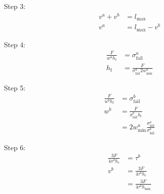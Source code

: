 Step 3:
\begin{align*}
	v^a + v^b &= l_\text{max} \\
	v^a &= l_\text{max} - v^b
\end{align*}

Step 4:
\begin{align*}
	\frac{ F }{ w^a h_\text{f} } &= \sigma^a_\text{fail} \\
	h_\text{f} %
	 &= \frac{F}{ \sigma^a_\text{fail}  2 w^a_\text{min} }
\end{align*}

Step 5:
\begin{align*}
	\frac{ F }{ w^b h_\text{f} } &= \sigma^b_\text{fail} \\
	w^b &= \frac{ F }{ \sigma^b_\text{fail} h_\text{f} } \\
	&=  2 w^a_\text{min} \frac{ \sigma^a_\text{fail} }{ \sigma^b_\text{fail}}
\end{align*}

Step 6:
\begin{align*}
	\frac{ 3 F }{ 4 v^b h_\text{c}} &= \tau^b \\
	v^b &= \frac{ 3 F }{ 4 \tau^b h_\text{c} } \\
	&= \frac{ 3 F }{ 4 \tau^b h_\text{min} }
\end{align*}

